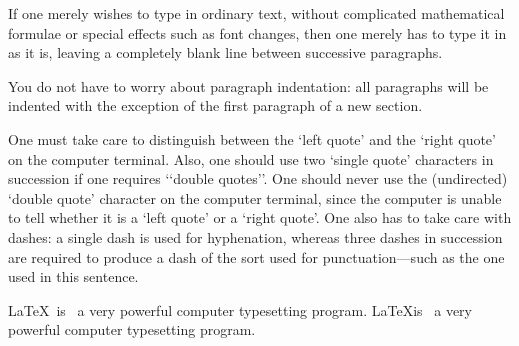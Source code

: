 \documentclass[a4paper,12pt]{article}
\begin{document}
If one merely wishes to type in ordinary text, without
complicated mathematical formulae or special effects such
as font changes, then one merely has to type it in as it
is, leaving a completely blank line between successive
paragraphs.

You do not have to worry about paragraph indentation:
all paragraphs will be indented with the exception of
the first paragraph of a new section.

One must take care to distinguish between the ‘left quote’
and the ‘right quote’ on the computer terminal. Also, one
should use two ‘single quote’ characters in succession if
one requires ‘‘double quotes’’. One should never use the
(undirected) ‘double quote’ character on the computer
terminal, since the computer is unable to tell whether it
is a ‘left quote’ or a ‘right quote’. One also has to
take care with dashes: a single dash is used for
hyphenation, whereas three dashes in succession are required
to produce a dash of the sort used for punctuation---such as
the one used in this sentence.

\LaTeX\ is \ a very powerful computer typesetting program.
\LaTeX is \ a very powerful computer typesetting program.
\end{document}

